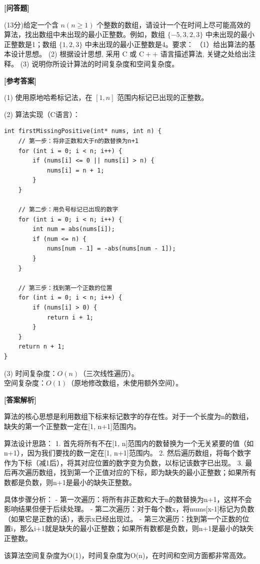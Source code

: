 \documentclass[12pt,a4paper]{article}
\newenvironment{choicequestion}[1][]{%
    \vspace{0.5cm}
    \noindent\textbf{[#1]}
    \vspace{0.2cm}
}{}
\newenvironment{answersection}{%
    \vspace{0.2cm}
    \noindent\textbf{[参考答案]}\\
    \vspace{0.1cm}
}{}
\newenvironment{analysissection}{%
    \vspace{0.2cm}
    \noindent\textbf{[答案解析]}\\
    \vspace{0.1cm}
}{}
\newcounter{questioncounter}
\newcounter{questioncounter}
\newcommand{\question}[2]{%
    \stepcounter{questioncounter}%
    \noindent\textbf{\thequestioncounter} #1%
}
\begin{document}
\begin{choicequestion}[问答题]
\question{(13分)给定一个含 $n(n\geqslant 1)$ 个整数的数组，请设计一个在时间上尽可能高效的算法，找出数组中未出现的最小正整数。例如，数组 $\{-5,3,2,3\}$ 中未出现的最小正整数是1；数组 $\{1,2,3\}$ 中未出现的最小正整数是4。要求：\newline
（1）给出算法的基本设计思想。  \newline
(2) 根据设计思想, 采用 C 或 $\mathrm{C}++$ 语言描述算法, 关键之处给出注释。  \newline
(3) 说明你所设计算法的时间复杂度和空间复杂度。}{}

\begin{answersection}
(1) 使用原地哈希标记法，在 $[1,n]$ 范围内标记已出现的正整数。

(2) 算法实现（C语言）：
\begin{verbatim}
int firstMissingPositive(int* nums, int n) {
    // 第一步：将非正数和大于n的数替换为n+1
    for (int i = 0; i < n; i++) {
        if (nums[i] <= 0 || nums[i] > n) {
            nums[i] = n + 1;
        }
    }
    
    // 第二步：用负号标记已出现的数字
    for (int i = 0; i < n; i++) {
        int num = abs(nums[i]);
        if (num <= n) {
            nums[num - 1] = -abs(nums[num - 1]);
        }
    }
    
    // 第三步：找到第一个正数的位置
    for (int i = 0; i < n; i++) {
        if (nums[i] > 0) {
            return i + 1;
        }
    }
    return n + 1;
}
\end{verbatim}

(3) 时间复杂度：$O(n)$（三次线性遍历）。\\
空间复杂度：$O(1)$（原地修改数组，未使用额外空间）。

\end{answersection}

\begin{analysissection}
算法的核心思想是利用数组下标来标记数字的存在性。对于一个长度为n的数组，缺失的第一个正整数一定在[1, n+1]范围内。

算法设计思路：
1. 首先将所有不在[1, n]范围内的数替换为一个无关紧要的值（如n+1），因为我们要找的数一定在[1, n+1]范围内。
2. 然后遍历数组，将每个数字作为下标（减1后），将其对应位置的数字变为负数，以标记该数字已出现。
3. 最后再次遍历数组，找到第一个正值对应的下标，即为缺失的最小正整数；如果所有数都是负数，则n+1是最小的缺失正整数。

具体步骤分析：
- 第一次遍历：将所有非正数和大于n的数替换为n+1，这样不会影响结果但便于后续处理。
- 第二次遍历：对于每个数x，将nums[x-1]标记为负数（如果它是正数的话），表示x已经出现过。
- 第三次遍历：找到第一个正数的位置i，那么i+1就是缺失的最小正整数；如果所有数都是负数，则n+1是最小的缺失正整数。

该算法空间复杂度为O(1)，时间复杂度为O(n)，在时间和空间方面都非常高效。
\end{analysissection}
\end{choicequestion}
\end{document}
